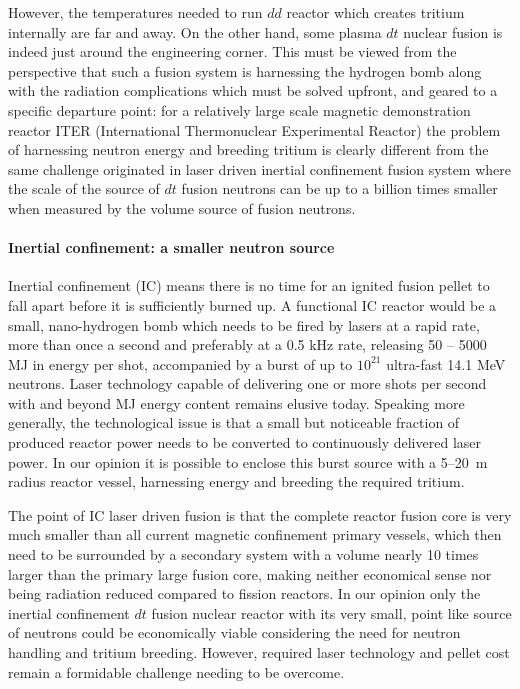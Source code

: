\documentclass[particles,article,accept,pdftex,moreauthors]{Definitions/mdpi}
\begin{document}
However, the temperatures needed to run $dd$ reactor which creates tritium internally are far and away. On the other hand, some plasma $dt$ nuclear fusion is indeed just around the engineering corner. This must be viewed from the perspective that such a fusion system is harnessing the hydrogen bomb along with the radiation complications which must be solved upfront, and geared to a specific departure point: for a relatively large scale magnetic demonstration reactor ITER (International Thermonuclear Experimental Reactor) the problem of harnessing neutron energy and breeding tritium is clearly different from the same challenge originated in laser driven inertial confinement fusion system where the scale of the source of $dt$ fusion neutrons can be up to a billion times smaller when measured by the volume source of fusion neutrons.

\paragraph*{\bf Inertial confinement: a smaller neutron source}
Inertial confinement (IC) means there is no time for an ignited fusion pellet to fall apart before it is sufficiently burned up. A functional IC reactor would be a small, nano-hydrogen bomb which needs to be fired by lasers at a  rapid rate, more than once a second and preferably at a 0.5 kHz rate, releasing  50 -- 5000 \,MJ in energy per shot, accompanied by a burst of up to $  10^{21}$ ultra-fast 14.1 MeV neutrons.   Laser technology capable of delivering one or more shots per second with and beyond MJ energy content remains elusive today. Speaking more generally, the technological issue is that a small but noticeable fraction of produced reactor power needs to be converted to continuously delivered laser power. In our opinion it is possible to enclose this burst source with a 5--20~m radius reactor vessel, harnessing energy and breeding the required tritium.

The point of IC laser driven fusion is that the complete reactor fusion core is very much smaller than all current magnetic confinement primary vessels, which then need to be surrounded by a secondary system with a volume nearly 10 times larger than the primary large fusion core, making neither economical sense nor being radiation reduced compared to fission reactors. In our opinion only the inertial confinement $dt$ fusion nuclear reactor with its very small, point like source of neutrons could be economically viable considering the need for neutron handling and tritium breeding. However, required laser technology and pellet cost remain a formidable challenge needing to be overcome.
\end{document}

